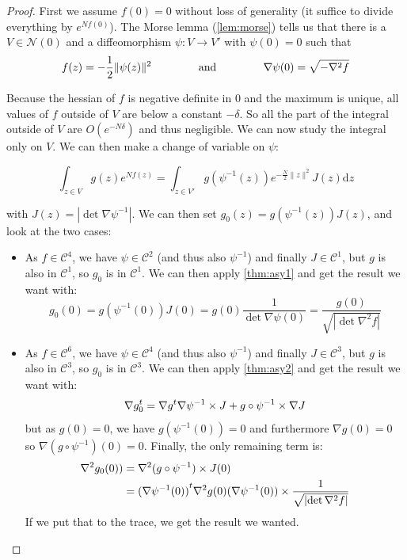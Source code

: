 \documentclass[10pt,a4paper]{report}
\theoremstyle{plain}
\theoremstyle{definition}
\theoremstyle{remark}
\newcommand{\dd}{\mathrm{d}}
\newcommand{\class}[1]{{\mathscr{C}^{#1}}}
\newcommand{\gap}{\hspace{1.5cm}}
\begin{document}
\begin{proof}
First we assume $f(0) = 0$ without loss of generality (it suffice to divide
everything by $e^{Nf(0)}$). The Morse lemma (\ref{lem:morse}) tells us that
there is a $V \in \mathcal{N}(0)$ and
a diffeomorphism $\psi : V \to V'$ with $\psi(0) = 0$ such that
\[f(z) = - \frac12 \|\psi(z)\|^2 \gap \text{and}\gap \nabla \psi(0) =
  \sqrt{-\nabla^2 f}\]

Because the hessian of $f$ is negative definite in 0 and the maximum is unique,
all values of $f$ outside of $V$ are below a
constant $-\delta$. So all the part of the integral outside of $V$ are
$O(e^{-N\delta})$ and thus negligible. We can now study the integral only on
$V$. We can then make a change of variable on $\psi$:

\[\int_{z \in V} g(z)e^{Nf(z)} = \int_{z \in V'}
  g(\psi^{-1}(z))e^{-\frac N2\|z\|^2} J(z) \dd z\]

with $J(z) = |\det{\nabla \psi^{-1}}|$. We can then set $g_0(z) =
g(\psi^{-1}(z))J(z)$, and look at the two cases:
\begin{itemize}
  \item As $f \in \class 4$, we have $\psi \in \class 2$ (and thus also
    $\psi^{-1}$) and finally $J \in \class 1$, but $g$ is also in $\class 1$, so
    $g_0$ is in $\class 1$. We can then apply \cref{thm:asy1} and get the result
    we want with:
\[g_0(0) = g(\psi^{-1}(0))J(0) = g(0)\frac 1 {\det {\nabla \psi(0)}} =
  \frac {g(0)}{\sqrt{\left|\det \nabla^2 f\right|}}
  \]


  \item As $f \in \class 6$, we have $\psi \in \class 4$ (and thus also
    $\psi^{-1}$) and finally $J \in \class 3$, but $g$ is also in $\class 3$, so
    $g_0$ is in $\class 3$. We can then apply \cref{thm:asy2} and get the result
    we want with:
    \[\nabla g_0^t = \nabla g^t \nabla \psi^{-1} \times J + g \circ \psi^{-1}
      \times \nabla J\]
    but as $g(0) = 0$, we have $g(\psi^{-1}(0)) = 0$ and furthermore $\nabla
    g(0) = 0$ so $\nabla (g \circ \psi^{-1})(0) = 0$. Finally, the only remaining term is:
    \begin{align*}
      \nabla^2 g_0(0))
      &= \nabla^2 (g \circ \psi^{-1}) \times J(0)\\
      &= {(\nabla \psi^{-1}(0))}^t\nabla^2 g(0) {(\nabla \psi^{-1}(0))} \times
         \frac {1}{\sqrt{\left|\det \nabla^2 f\right|}}
    \end{align*}
    If we put that to the trace, we get the result we wanted.

\end{itemize}

\end{proof}
\end{document}
